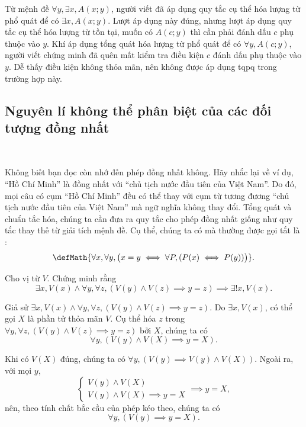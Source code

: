 \stepSubexercise Từ mệnh đề $\forall y, \exists x, A(x; y)$, người viết đã áp dụng quy tắc cụ thể hóa lượng từ phổ quát để có $\exists x, A(x; y)$. Lượt áp dụng này đúng, nhưng lượt áp dụng quy tắc cụ thể hóa lượng từ tồn tại, muốn có $A(c; y)$ thì cần phải đánh dấu $c$ phụ thuộc vào $y$. Khí áp dụng tổng quát hóa lượng từ phổ quát để có $\forall y, A(c; y)$, người viết chứng minh đã quên mất kiểm tra điều kiện $c$ đánh dấu phụ thuộc vào $y$. Dễ thấy điều kiện không thỏa mãn, nên không được áp dụng tqpq trong trường hợp này.

\subsection{Nguyên lí không thể phân biệt của các đối tượng đồng nhất}

\ 

Không biết bạn đọc còn nhớ đến phép đồng nhất không. Hãy nhắc lại về ví dụ, ``Hồ Chí Minh'' là đồng nhất với ``chủ tịch nước đầu tiên của Việt Nam''. Do đó, mọi câu có cụm ``Hồ Chí Minh'' đều có thể thay với cụm từ tương đương ``chủ tịch nước đầu tiên của Việt Nam'' mà ngữ nghĩa không thay đổi. Tổng quát và chuẩn tắc hóa, chúng ta cần đưa ra quy tắc cho phép đồng nhất giống như quy tắc thay thế từ giải tích mệnh đề. Cụ thể, chúng ta có  mà thường được gọi tắt là :
\begin{equation*}
   \defMath{\forall x, \forall y, \bigl(x = y \iff \forall P, (P(x) \iff P(y))\bigr)}.
\end{equation*}

\exercise Cho vị từ $V$. Chứng minh rằng 
\begin{equation*}
   \exists x, V(x) \land \forall y, \forall z, (V(y) \land V(z) \implies y = z) \implies \exists ! x, V(x).
\end{equation*}

\solution

Giả sử $\exists x, V(x) \land \forall y, \forall z, (V(y) \land V(z) \implies y = z).$ Do $\exists x, V(x)$, có thể gọi $X$ là phần tử thỏa mãn $V$. Cụ thể hóa $z$ trong $\forall y, \forall z, (V(y) \land V(z) \implies y = z)$ bởi $X$, chúng ta có 
\begin{equation*}
   \forall y, \left(V(y) \land V\left(X\right) \implies y = X\right).
\end{equation*}

Khi có $V(X)$ đúng, chúng ta có $\forall y, (V(y) \implies V(y) \land V(X))$. Ngoài ra, với mọi $y$, $$\begin{cases}
   V(y) \land V(X) \\
   V(y) \land V(X) \implies y = X
\end{cases} \implies y = X,$$ nên, theo tính chất bắc cầu của phép kéo theo, chúng ta có
\begin{equation*}
   \forall y, (V(y) \implies y = X).
\end{equation*}

